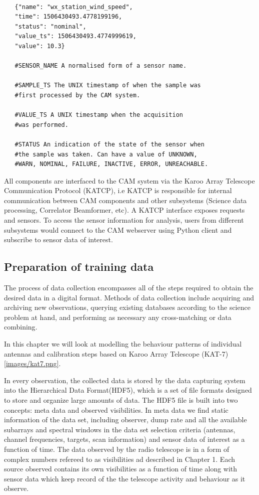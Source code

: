 \begin{tcolorbox} 
\begin{lstlisting}

   {"name": "wx_station_wind_speed",
   "time": 1506430493.4778199196,
   "status": "nominal",
   "value_ts": 1506430493.4774999619,
   "value": 10.3}

   #SENSOR_NAME A normalised form of a sensor name.

   #SAMPLE_TS The UNIX timestamp of when the sample was
   #first processed by the CAM system.

   #VALUE_TS A UNIX timestamp when the acquisition
   #was performed. 

   #STATUS An indication of the state of the sensor when
   #the sample was taken. Can have a value of UNKNOWN,
   #WARN, NOMINAL, FAILURE, INACTIVE, ERROR, UNREACHABLE. 
\end{lstlisting}
\end{tcolorbox}
\citep{slabber2015illustrate}

All components are interfaced to the CAM system via the Karoo Array Telescope Communication Protocol (KATCP), i.e KATCP is responsible for internal communication between CAM components and other subsystems (Science data processing, Correlator Beamformer, etc)\citep{slabber2015overview}. A KATCP interface exposes requests and sensors. To access the sensor information for analysis, users from different subsystems  would  connect to the CAM webserver using Python client and subscribe to sensor data of interest. 

\subsection{Preparation of training data}\label{prep}
The process of data collection encompasses all of the steps required to obtain the desired data in a digital format. Methods of data collection include acquiring and archiving new observations, querying existing databases according to the science
problem at hand, and performing as necessary any cross-matching or data combining\citep{ball2010data}.

In this chapter we will look at modelling the behaviour patterns of individual antennas and calibration steps based on Karoo Array Telescope (KAT-7) \ref{images/kat7.png}.

In every observation, the collected data is stored by the data capturing system into the Hierarchical Data Format(HDF5), which is a set of file formats designed to store and organize large amounts of data. The HDF5 file is built into two concepts: meta data and observed visibilities. In meta data we find static information of the data set, including observer, dump rate and all the available subarrays and spectral windows in the data set selection criteria (antennas, channel frequencies, targets, scan information) and sensor data of interest as a function of time. The data observed by the radio telescope is in a form of complex numbers refereed to as visibilities ad described in Chapter 1. Each source observed contains its own visibilities as a function of time along with sensor data  which keep record of the the telescope activity and behaviour as it observe.

